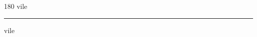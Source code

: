 
\begin{frame}
\begin{center}
\begin{turn}{180}
{\fontsize{2.5cm}{1em}\selectfont vile}
\end{turn}
\vspace{1em}\par  
\hrule
\vspace{1em}\par  
{\fontsize{2.5cm}{1em}\selectfont vile}
\end{center}
\end{frame}
